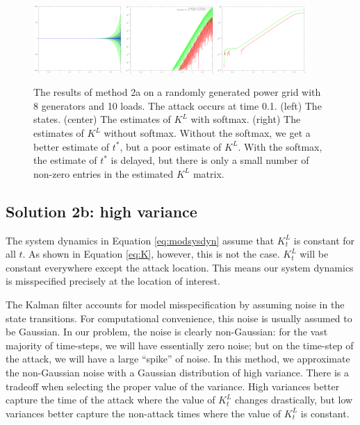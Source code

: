 \documentclass{article}
\begin{document}
\begin{figure}
\includegraphics[width=0.3\textwidth]{random-8x10x25-states}
\includegraphics[width=0.3\textwidth]{random-8x10x25-K_L}
\includegraphics[width=0.3\textwidth]{random-8x10x25-K_L-raw}
\caption{
    The results of method 2a on a randomly generated power grid with 8 generators and 10 loads.
    The attack occurs at time 0.1.
    (left) The states.
    (center) The estimates of $K^L$ with softmax.
    (right) The estimates of $K^L$ without softmax.
    Without the softmax, we get a better estimate of $t^*$, but a poor estimate of $K^L$.
    With the softmax, the estimate of $t^*$ is delayed, but there is only a small number of non-zero entries in the estimated $K^L$ matrix.
}
\end{figure}

\subsection*{Solution 2b: high variance}
The system dynamics in Equation \ref{eq:modsysdyn} assume that $K_t^L$ is constant for all $t$.
As shown in Equation \ref{eq:K}, however, this is not the case.
$K_t^L$ will be constant everywhere except the attack location.
This means our system dynamics is misspecified precisely at the location of interest.

The Kalman filter accounts for model misspecification by assuming noise in the state transitions.
For computational convenience, this noise is usually assumed to be Gaussian.
In our problem, the noise is clearly non-Gaussian:
for the vast majority of time-steps, we will have essentially zero noise;
but on the time-step of the attack, we will have a large ``spike'' of noise.
In this method, we approximate the non-Gaussian noise with a Gaussian distribution of high variance.
There is a tradeoff when selecting the proper value of the variance.
High variances better capture the time of the attack where the value of $K_t^L$ changes drastically,
but low variances better capture the non-attack times where the value of $K_t^L$ is constant.
\end{document}

